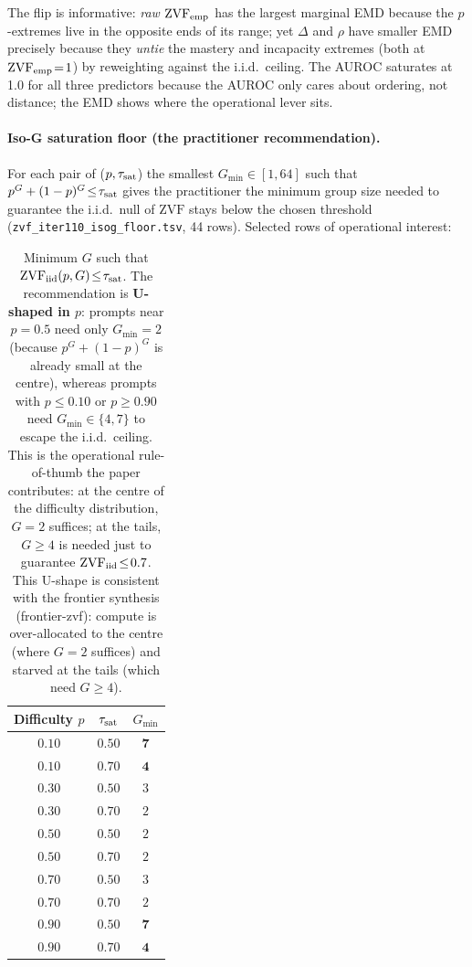 \noindent The flip is informative: \emph{raw $\mathrm{ZVF}_{\rm emp}$}
has the largest marginal EMD because the $p$-extremes live in the
opposite ends of its range; yet $\Delta$ and $\rho$ have smaller EMD
precisely because they \emph{untie} the mastery and incapacity
extremes (both at $\mathrm{ZVF}_{\rm emp}\!=\!1$) by reweighting
against the i.i.d.\ ceiling. The AUROC saturates at 1.0 for all three
predictors because the AUROC only cares about ordering, not distance;
the EMD shows where the operational lever sits.

\paragraph{Iso-G saturation floor (the practitioner recommendation).}
For each pair of ($p,\tau_{\rm sat}$) the smallest
$G_{\min}\!\in\![1,64]$ such that $p^{G}+(1-p)^{G}\!\leq\!\tau_{\rm sat}$
gives the practitioner the minimum group size needed to guarantee the
i.i.d.\ null of $\mathrm{ZVF}$ stays below the chosen threshold
(\texttt{zvf\_iter110\_isog\_floor.tsv}, 44 rows). Selected rows of
operational interest:

\begin{table}[ht]\centering\small
\begin{tabular}{ccc}
\toprule
Difficulty $p$ & $\tau_{\rm sat}$ & $G_{\min}$  \\
\midrule
$0.10$ & $0.50$ & $\mathbf{7}$  \\
$0.10$ & $0.70$ & $\mathbf{4}$  \\
$0.30$ & $0.50$ & $3$  \\
$0.30$ & $0.70$ & $2$  \\
$0.50$ & $0.50$ & $2$  \\
$0.50$ & $0.70$ & $2$  \\
$0.70$ & $0.50$ & $3$  \\
$0.70$ & $0.70$ & $2$  \\
$0.90$ & $0.50$ & $\mathbf{7}$  \\
$0.90$ & $0.70$ & $\mathbf{4}$  \\
\bottomrule
\end{tabular}
\caption{Minimum $G$ such that $\mathrm{ZVF}_{\rm iid}(p,G)\!\leq\!\tau_{\rm sat}$.
The recommendation is \textbf{U-shaped in $p$}: prompts near
$p\!=\!0.5$ need only $G_{\min}\!=\!2$ (because $p^{G}+(1-p)^{G}$
is already small at the centre), whereas prompts with
$p\!\leq\!0.10$ or $p\!\geq\!0.90$ need $G_{\min}\!\in\!\{4,7\}$ to
escape the i.i.d.\ ceiling. This is the operational rule-of-thumb the
paper contributes: at the centre of the difficulty distribution,
$G\!=\!2$ suffices; at the tails, $G\!\geq\!4$ is needed just to
guarantee $\mathrm{ZVF}_{\rm iid}\!\leq\!0.7$. This U-shape is
consistent with the frontier synthesis (frontier-zvf): compute is
over-allocated to the centre (where $G\!=\!2$ suffices) and
starved at the tails (which need $G\!\geq\!4$).}
\label{tab:zvf-isog}
\end{table}

